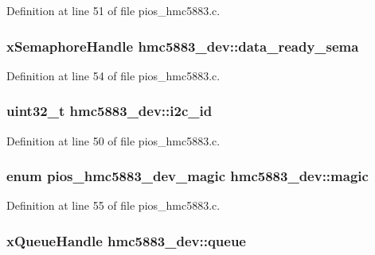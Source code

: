 \-Definition at line 51 of file pios\-\_\-hmc5883.\-c.

\hypertarget{structhmc5883__dev_a391988bf3eb9db5a73d9c8db759b1cff}{
\subsubsection[{data\-\_\-ready\-\_\-sema}]{\setlength{\rightskip}{0pt plus 5cm}x\-Semaphore\-Handle {\bf hmc5883\-\_\-dev\-::data\-\_\-ready\-\_\-sema}}}\label{structhmc5883__dev_a391988bf3eb9db5a73d9c8db759b1cff}


\-Definition at line 54 of file pios\-\_\-hmc5883.\-c.

\hypertarget{structhmc5883__dev_aebf7ac3174874aa4322f25c242c96cbc}{
\subsubsection[{i2c\-\_\-id}]{\setlength{\rightskip}{0pt plus 5cm}uint32\-\_\-t {\bf hmc5883\-\_\-dev\-::i2c\-\_\-id}}}\label{structhmc5883__dev_aebf7ac3174874aa4322f25c242c96cbc}


\-Definition at line 50 of file pios\-\_\-hmc5883.\-c.

\hypertarget{structhmc5883__dev_a035551dfd62138e07853dd71dfc252c4}{
\subsubsection[{magic}]{\setlength{\rightskip}{0pt plus 5cm}enum {\bf pios\-\_\-hmc5883\-\_\-dev\-\_\-magic} {\bf hmc5883\-\_\-dev\-::magic}}}\label{structhmc5883__dev_a035551dfd62138e07853dd71dfc252c4}


\-Definition at line 55 of file pios\-\_\-hmc5883.\-c.

\hypertarget{structhmc5883__dev_adc55a1a3ea4c43196bf7c411309485ac}{
\subsubsection[{queue}]{\setlength{\rightskip}{0pt plus 5cm}x\-Queue\-Handle {\bf hmc5883\-\_\-dev\-::queue}}}\label{structhmc5883__dev_adc55a1a3ea4c43196bf7c411309485ac}


